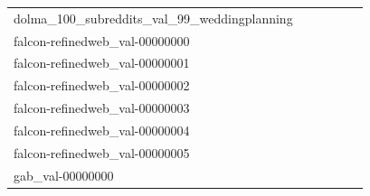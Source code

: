 \documentclass[dvipsnames]{article}
\begin{document}
\begin{appendix}
{\begin{longtable}{m{6cm}m{1.7cm}m{1.7cm}m{1.7cm}m{1.7cm}m{1.7cm}}
	dolma\_100\_subreddits\_val\_99\_weddingplanning  & \colorbox[HTML]{ffffe5}{\makebox[\mywidth][c]{20.11}} & \colorbox[HTML]{98d485}{\makebox[\mywidth][c]{19.01}} & \colorbox[HTML]{ffffe5}{\makebox[\mywidth][c]{20.33}} & \colorbox[HTML]{e5f4ab}{\makebox[\mywidth][c]{19.19}} & \colorbox[HTML]{77c578}{\makebox[\mywidth][c]{18.96}}\\
	falcon-refinedweb\_val-00000000  & \colorbox[HTML]{fbfdd3}{\makebox[\mywidth][c]{15.92}} & \colorbox[HTML]{d7efa2}{\makebox[\mywidth][c]{15.46}} & \colorbox[HTML]{ffffe5}{\makebox[\mywidth][c]{17.14}} & \colorbox[HTML]{bee496}{\makebox[\mywidth][c]{15.37}} & \colorbox[HTML]{77c578}{\makebox[\mywidth][c]{15.22}}\\
	falcon-refinedweb\_val-00000001  & \colorbox[HTML]{fbfdd3}{\makebox[\mywidth][c]{18.49}} & \colorbox[HTML]{c5e799}{\makebox[\mywidth][c]{17.91}} & \colorbox[HTML]{ffffe5}{\makebox[\mywidth][c]{19.89}} & \colorbox[HTML]{c2e698}{\makebox[\mywidth][c]{17.90}} & \colorbox[HTML]{77c578}{\makebox[\mywidth][c]{17.71}}\\
	falcon-refinedweb\_val-00000002  & \colorbox[HTML]{fcfdd5}{\makebox[\mywidth][c]{18.45}} & \colorbox[HTML]{d0ec9e}{\makebox[\mywidth][c]{17.90}} & \colorbox[HTML]{ffffe5}{\makebox[\mywidth][c]{19.69}} & \colorbox[HTML]{d1ec9f}{\makebox[\mywidth][c]{17.91}} & \colorbox[HTML]{77c578}{\makebox[\mywidth][c]{17.68}}\\
	falcon-refinedweb\_val-00000003  & \colorbox[HTML]{fcfed9}{\makebox[\mywidth][c]{16.75}} & \colorbox[HTML]{e5f4ab}{\makebox[\mywidth][c]{16.23}} & \colorbox[HTML]{ffffe5}{\makebox[\mywidth][c]{17.92}} & \colorbox[HTML]{d9f0a3}{\makebox[\mywidth][c]{16.16}} & \colorbox[HTML]{77c578}{\makebox[\mywidth][c]{15.89}}\\
	falcon-refinedweb\_val-00000004  & \colorbox[HTML]{fdfedc}{\makebox[\mywidth][c]{16.26}} & \colorbox[HTML]{d9f0a3}{\makebox[\mywidth][c]{15.66}} & \colorbox[HTML]{ffffe5}{\makebox[\mywidth][c]{17.32}} & \colorbox[HTML]{e5f4ab}{\makebox[\mywidth][c]{15.73}} & \colorbox[HTML]{77c578}{\makebox[\mywidth][c]{15.41}}\\
	falcon-refinedweb\_val-00000005  & \colorbox[HTML]{fbfdd4}{\makebox[\mywidth][c]{15.41}} & \colorbox[HTML]{d4eea0}{\makebox[\mywidth][c]{14.96}} & \colorbox[HTML]{ffffe5}{\makebox[\mywidth][c]{16.56}} & \colorbox[HTML]{c9e99b}{\makebox[\mywidth][c]{14.92}} & \colorbox[HTML]{77c578}{\makebox[\mywidth][c]{14.74}}\\
	gab\_val-00000000  & \colorbox[HTML]{ffffe5}{\makebox[\mywidth][c]{33.19}} & \colorbox[HTML]{bee496}{\makebox[\mywidth][c]{30.55}} & \colorbox[HTML]{fdfedb}{\makebox[\mywidth][c]{31.57}} & \colorbox[HTML]{ddf1a6}{\makebox[\mywidth][c]{30.73}} & \colorbox[HTML]{77c578}{\makebox[\mywidth][c]{30.32}}\\

\end{longtable}}
\end{appendix}
\end{document}
